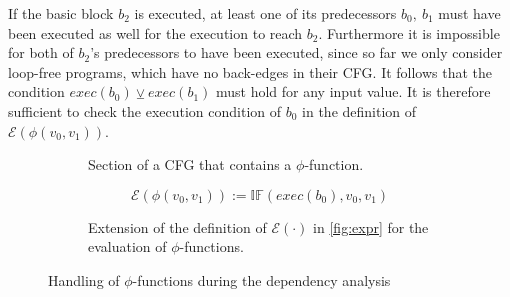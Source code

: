 If the basic block $b_2$ is executed, at least one of its predecessors $b_0, \: b_1$ must have been executed as well for the execution to reach $b_2$. Furthermore it is impossible for both of $b_2$'s predecessors to have been executed, since so far we only consider loop-free programs, which have no back-edges in their CFG. It follows that the condition $exec(b_0) \veebar exec(b_1)$ must hold for any input value. It is therefore sufficient to check the execution condition of $b_0$ in the definition of $\mathcal{E}(\phi(v_0, v_1))$.

\begin{figure}
\begin{subfigure}{.4\textwidth}
    \centering
    \caption{Section of a CFG that contains a $\phi$-function.}
    \label{fig:phi}
\end{subfigure}
\hfill
\begin{subfigure}{.5\textwidth}
\vspace{1cm}
    \begin{equation*}
\mathcal{E}(\phi(v_0, v_1)) := \mathbb{IF}(exec(b_0), v_0, v_1)
\end{equation*}
\vspace{1cm}
\caption{Extension of the definition of $\mathcal{E}(\cdot)$ in \ref{fig:expr} for the evaluation of $\phi$-functions.}\label{fig:exprPhi}
\end{subfigure}
\caption{Handling of $\phi$-functions during the dependency analysis}
\end{figure}

